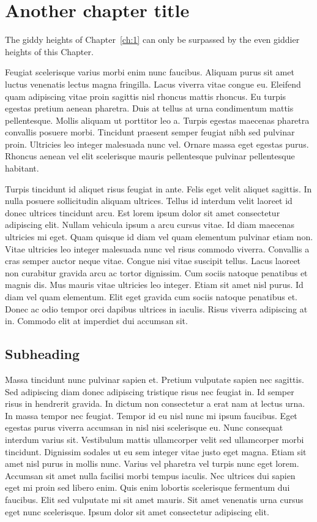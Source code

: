 
\chapter{Another chapter title} \label{ch:2}


The giddy heights of Chapter~\ref{ch:1} can only be surpassed by the even giddier heights of this Chapter.

Feugiat scelerisque varius morbi enim nunc faucibus. Aliquam purus sit amet luctus venenatis lectus magna fringilla. Lacus viverra vitae congue eu. Eleifend quam adipiscing vitae proin sagittis nisl rhoncus mattis rhoncus. Eu turpis egestas pretium aenean pharetra. Duis at tellus at urna condimentum mattis pellentesque. Mollis aliquam ut porttitor leo a. Turpis egestas maecenas pharetra convallis posuere morbi. Tincidunt praesent semper feugiat nibh sed pulvinar proin. Ultricies leo integer malesuada nunc vel. Ornare massa eget egestas purus. Rhoncus aenean vel elit scelerisque mauris pellentesque pulvinar pellentesque habitant.

Turpis tincidunt id aliquet risus feugiat in ante. Felis eget velit aliquet sagittis. In nulla posuere sollicitudin aliquam ultrices. Tellus id interdum velit laoreet id donec ultrices tincidunt arcu. Est lorem ipsum dolor sit amet consectetur adipiscing elit. Nullam vehicula ipsum a arcu cursus vitae. Id diam maecenas ultricies mi eget. Quam quisque id diam vel quam elementum pulvinar etiam non. Vitae ultricies leo integer malesuada nunc vel risus commodo viverra. Convallis a cras semper auctor neque vitae. Congue nisi vitae suscipit tellus. Lacus laoreet non curabitur gravida arcu ac tortor dignissim. Cum sociis natoque penatibus et magnis dis. Mus mauris vitae ultricies leo integer. Etiam sit amet nisl purus. Id diam vel quam elementum. Elit eget gravida cum sociis natoque penatibus et. Donec ac odio tempor orci dapibus ultrices in iaculis. Risus viverra adipiscing at in. Commodo elit at imperdiet dui accumsan sit.

\section*{Subheading}

Massa tincidunt nunc pulvinar sapien et. Pretium vulputate sapien nec sagittis. Sed adipiscing diam donec adipiscing tristique risus nec feugiat in. Id semper risus in hendrerit gravida. In dictum non consectetur a erat nam at lectus urna. In massa tempor nec feugiat. Tempor id eu nisl nunc mi ipsum faucibus. Eget egestas purus viverra accumsan in nisl nisi scelerisque eu. Nunc consequat interdum varius sit. Vestibulum mattis ullamcorper velit sed ullamcorper morbi tincidunt. Dignissim sodales ut eu sem integer vitae justo eget magna. Etiam sit amet nisl purus in mollis nunc. Varius vel pharetra vel turpis nunc eget lorem. Accumsan sit amet nulla facilisi morbi tempus iaculis. Nec ultrices dui sapien eget mi proin sed libero enim. Quis enim lobortis scelerisque fermentum dui faucibus. Elit sed vulputate mi sit amet mauris. Sit amet venenatis urna cursus eget nunc scelerisque. Ipsum dolor sit amet consectetur adipiscing elit.

